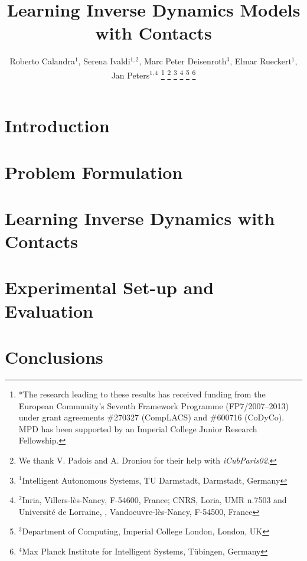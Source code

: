 \documentclass[letterpaper, 10 pt, mydraft, conference]{ieeeconf}  %
\title{\LARGE \bf
Learning Inverse Dynamics Models with Contacts
}
\author{Roberto Calandra$^{1}$, Serena Ivaldi$^{1,2}$, Marc Peter Deisenroth$^{3}$, Elmar Rueckert$^{1}$, Jan Peters$^{1,4}$%
\thanks{*The research leading to these results has received funding from the European Community's Seventh Framework Programme (FP7/2007--2013) under grant agreements \#270327 (CompLACS) and \#600716 (CoDyCo). MPD has been supported by an Imperial College Junior Research Fellowship.}%
\thanks{We thank V. Padois and A. Droniou for their help with \textit{iCubParis02}.}
\thanks{$^{1}$Intelligent Autonomous Systems, TU Darmstadt, Darmstadt, Germany}%
\thanks{$^{2}$Inria, Villers-l\`es-Nancy, F-54600, France; CNRS, Loria, UMR n.7503 and Universit\'e de Lorraine, , Vandoeuvre-l\`es-Nancy, F-54500, France}%
\thanks{$^{3}$Department of Computing, Imperial College London, London, UK}%
\thanks{$^{4}$Max Planck Institute for Intelligent Systems, T\"ubingen, Germany} %
}
\begin{document}
\maketitle
\thispagestyle{empty}
\pagestyle{empty}



\begin{abstract}
	
\end{abstract}


\section{Introduction}
\label{sec:introduction}

	 


\section{Problem Formulation}
\label{sec:problem}

	
    

\section{Learning Inverse Dynamics with Contacts}
\label{sec:mgp}

	 
	

\section{Experimental Set-up and Evaluation}
\label{sec:results}

	 


\section{Conclusions}
\label{sec:conclusion}
\end{document}
